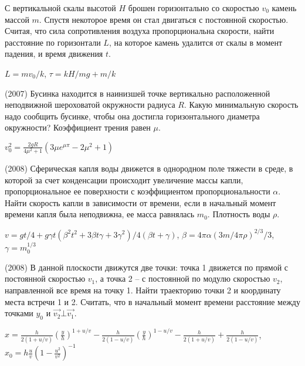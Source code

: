 \begin{ex}
С вертикальной скалы высотой $H$ брошен горизонтально со скоростью $v_0$ камень массой $m$. Спустя некоторое время он стал двигаться с постоянной скоростью. Считая, что сила сопротивления воздуха пропорциональна скорости, найти расстояние по горизонтали $L$, на которое камень удалится от скалы в момент падения, и время движения $t$.
\begin{ans}
$L = mv_0/k$, $\tau = kH/mg + m/k$
\end{ans}
\end{ex}

\begin{ex}
(2007) Бусинка находится в наинизшей точке вертикально расположенной неподвижной шероховатой окружности радиуса $R$. Какую минимальную скорость надо сообщить бусинке, чтобы она достигла горизонтального диаметра окружности? Коэффициент трения равен $\mu$.
\begin{ans}
$v_0^2 = \frac{2gR}{4\mu^2+1}\left( 3\mu e^{\mu \pi} - 2\mu^2 +1\right)$
\end{ans}
\end{ex}

\begin{ex}
(2008) Сферическая капля воды движется в однородном поле тяжести в среде, в которой за счет конденсации происходит увеличение массы капли, пропорциональное ее поверхности с коэффициентом пропорциональности $\alpha$. Найти скорость капли в зависимости от времени, если в начальный момент времени капля была неподвижна, ее масса равнялась $m_0$. Плотность воды $\rho$.
\begin{ans}
$v=gt/4+g\gamma t (\beta^2t^2+3\beta t \gamma+3\gamma^2)/4(\beta t + \gamma)$, $\beta = 4\pi \alpha(3m/4\pi\rho)^{2/3}/3$, $\gamma = m_0^{1/3}$
\end{ans}
\end{ex}

\begin{ex} (2008) В данной плоскости движутся две точки: точка 1 движется по прямой с постоянной скоростью $v_1$, а точка 2 – с постоянной по модулю скоростью $v_2$, направленной все время на точку 1. Найти траекторию точки 2 и координату места встречи 1 и 2. Считать, что в начальный момент времени расстояние между точками $y_0$ и $\vec{v_2} \bot \vec{v_1}$.
\begin{ans}
$x=\frac{h}{2(1+u/v)}(\frac{y}{h})^{1+u/v} - \frac{h}{2(1-u/v)}(\frac{y}{h})^{1-u/v} - \frac{h}{2(1+u/v)}+\frac{h}{2(1-u/v)}$, $x_0=h\frac{u}{v}\left(1-\frac{u^2}{v^2}\right)^{-1}$
\end{ans}
\end{ex}

